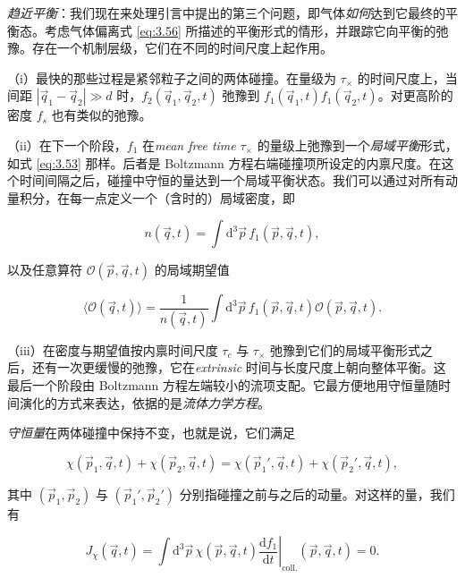 \emph{趋近平衡}：我们现在来处理引言中提出的第三个问题，即气体\emph{如何}达到它最终的平衡态。考虑气体偏离式 \eqref{eq:3.56} 所描述的平衡形式的情形，并跟踪它向平衡的弛豫。存在一个机制层级，它们在不同的时间尺度上起作用。

（i）最快的那些过程是紧邻粒子之间的两体碰撞。在量级为 $\tau_\times$ 的时间尺度上，当间距 $|\vec q_1-\vec q_2|\gg d$ 时，$f_2(\vec q_1,\vec q_2,t)$ 弛豫到 $f_1(\vec q_1,t)f_1(\vec q_2,t)$。对更高阶的密度 $f_s$ 也有类似的弛豫。

（ii）在下一个阶段，$f_1$ 在\textit{mean free time} $\tau_\times$ 的量级上弛豫到一个\emph{局域平衡}形式，如式 \eqref{eq:3.53} 那样。后者是 Boltzmann 方程右端碰撞项所设定的内禀尺度。在这个时间间隔之后，碰撞中守恒的量达到一个局域平衡状态。我们可以通过对所有动量积分，在每一点定义一个（含时的）局域密度，即

\begin{equation}\label{eq:3.69}
  n(\vec q,t)=\int \mathrm{d}^3\vec p\,f_1(\vec p,\vec q,t),
\end{equation}

以及任意算符 $\mathcal O(\vec p,\vec q,t)$ 的局域期望值

\begin{equation}\label{eq:3.70}
  \langle\mathcal O(\vec q,t)\rangle=\frac{1}{n(\vec q,t)}\int \mathrm{d}^3\vec p\,f_1(\vec p,\vec q,t)\mathcal O(\vec p,\vec q,t).
\end{equation}

（iii）在密度与期望值按内禀时间尺度 $\tau_c$ 与 $\tau_\times$ 弛豫到它们的局域平衡形式之后，还有一次更缓慢的弛豫，它在\textit{extrinsic} 时间与长度尺度上朝向整体平衡。这最后一个阶段由 Boltzmann 方程左端较小的流项支配。它最方便地用守恒量随时间演化的方式来表达，依据的是\emph{流体力学方程}。

\emph{守恒量}在两体碰撞中保持不变，也就是说，它们满足

\begin{equation}\label{eq:3.71}
  \chi(\vec p_1,\vec q,t)+\chi(\vec p_2,\vec q,t)=\chi(\vec p_1{}',\vec q,t)+\chi(\vec p_2{}',\vec q,t),
\end{equation}

其中 $(\vec p_1,\vec p_2)$ 与 $(\vec p_1',\vec p_2')$ 分别指碰撞之前与之后的动量。对这样的量，我们有

\begin{equation}\label{eq:3.72}
  J_\chi(\vec q,t)=\int \mathrm{d}^3\vec p\,\chi(\vec p,\vec q,t)\left.\frac{\mathrm{d}f_1}{\mathrm{d}t}\right|_{\text{coll.}}(\vec p,\vec q,t)=0.
\end{equation}


